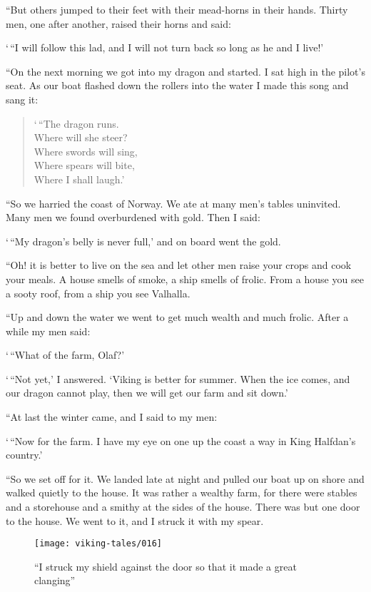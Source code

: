 ``But others jumped to their feet with their mead-horns in their hands.
Thirty men, one after another, raised their horns and said:

`\,``I will follow this lad, and I will not turn back so long as he and I
live!'

``On the next morning we got into my dragon and started. I sat high in
the pilot's seat. As our boat flashed down the rollers into the water I
made this song and sang it:

\begin{quote}
`\,``The dragon runs.\\
Where will she steer?\\
Where swords will sing,\\
Where spears will bite,\\
Where I shall laugh.'
\end{quote}

``So we harried the coast of Norway. We ate at many men's tables
uninvited. Many men we found overburdened with gold. Then I said:

`\,``My dragon's belly is never full,' and on board went the gold.

``Oh! it is better to live on the sea and let other men raise your crops
and cook your meals. A house smells of smoke, a ship smells of frolic.
From a house you see a sooty roof, from a ship you see Valhalla.

``Up and down the water we went to get much wealth and much frolic. After
a while my men said:

`\,``What of the farm, Olaf?'

`\,``Not yet,' I answered. `Viking is better for summer. When the ice
comes, and our dragon cannot play, then we will get our farm and sit
down.'

``At last the winter came, and I said to my men:

`\,``Now for the farm. I have my eye on one up the coast a way in King
Halfdan's country.'

``So we set off for it. We landed late at night and pulled our boat up on
shore and walked quietly to the house. It was rather a wealthy farm, for
there were stables and a storehouse and a smithy at the sides of the
house. There was but one door to the house. We went to it, and I struck
it with my spear.

\begin{figure}[ht]
    \centering
    \texttt{[image: viking-tales/016]}
    \caption{
        ``I struck my shield against the door so that it made a great
        clanging''}
\end{figure}

